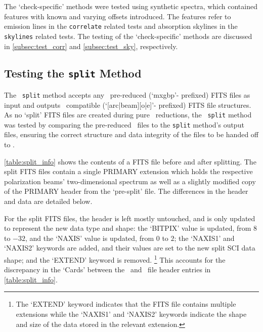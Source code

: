 The `check-specific' methods were tested using synthetic spectra, which contained features with known and varying offsets introduced.
The features refer to emission lines in the \texttt{correlate} related tests and absorption skylines in the \texttt{skylines} related tests.
The testing of the `check-specific' methods are discussed in \autoref{subsec:test_corr} and \autoref{subsec:test_sky}, respectively.

\subsection[The \texttt{split} Method]{Testing the \texttt{split} Method} \label{subsec:test_split}

The \stops\ \texttt{split} method accepts any \polsalt\ pre-reduced (`mxgbp'- prefixed) \gls{FITS} files as input and outputs \iraf\ compatible (`[arc|beam][o|e]'- prefixed) \gls{FITS} file structures.
As no `split' \gls{FITS} files are created during pure \polsalt\ reductions, the \stops\ \texttt{split} method was tested by comparing the pre-reduced \polsalt\ files to the \texttt{split} method's output files, ensuring the correct structure and data integrity of the files to be handed off to \iraf.



\autoref{table:split_info} shows the contents of a \gls{FITS} file before and after splitting.
The split \gls{FITS} files contain a single \gls{PRIMARY} extension which holds the respective polarization beams' two-dimensional spectrum as well as a slightly modified copy of the \gls{PRIMARY} header from the `pre-split' file.
The differences in the header and data are detailed below.

For the split \gls{FITS} files, the header is left mostly untouched, and is only updated to represent the new data type and shape:
the `BITPIX' value is updated, from $8$ to $-32$, and the `NAXIS' value is updated, from $0$ to $2$;
the `NAXIS1' and `NAXIS2' keywords are added, and their values are set to the new split \gls{SCI} data shape;
and the `EXTEND' keyword is removed.%
\footnote{The `EXTEND' keyword indicates that the \gls{FITS} file contains multiple extensions while the `NAXIS1' and `NAXIS2' keywords indicate the shape and size of the data stored in the relevant extension.}
This accounts for the discrepancy in the `Cards' between the \polsalt\ and \stops\ file header entries in \autoref{table:split_info}.

